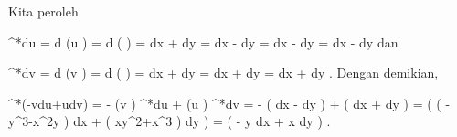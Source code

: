 Kita peroleh

\mavergleichskettealign
{\vergleichskettealign
{ \pi^*du
}
{ =} { d (u \circ \pi)
}
{ =} { d   \left(  {  }  \right)
}
{ =} { {  }   dx + {  } dy
}
{ =} { {  }  dx   - {  }  dy
}
}
{
\vergleichskettefortsetzungalign
{ =} { {  }  dx  - {  }  dy
}
{ =} { {  }  dx  - {  }  dy
}
{ } {}
{ } {}
}
{}{}
dan

\mavergleichskettealign
{\vergleichskettealign
{ \pi^*dv
}
{ =} { d (v \circ \pi)
}
{ =} { d \left(  {  }  \right)
}
{ =} { {  } dx + {  } dy
}
{ =} { {  } dx + {  } dy
}
}
{
\vergleichskettefortsetzungalign
{ =} { {  } dx + {  }  dy
}
{ } {
}
{ } {}
{ } {}
}
{}{.}
Dengan demikian,

\mavergleichskettealigndrucklinks
{\vergleichskettealigndrucklinks
{ \pi^*(-vdu+udv)
}
{ =} { - (v \circ \pi)  \pi^*du + (u \circ \pi) \pi^*dv
}
{ =} { - {  } \left(  {  }  dx  - {  }  dy   \right) + {  }  \left(  {  } dx + {  } dy  \right)
}
{ =} { {  }  \left(  \left(  -y^3-x^2y  \right) dx + \left(  xy^2+x^3  \right) dy \right)
}
{ =} { {  }  \left(  -  y dx + x dy \right)
}
}
{}{}{.}
